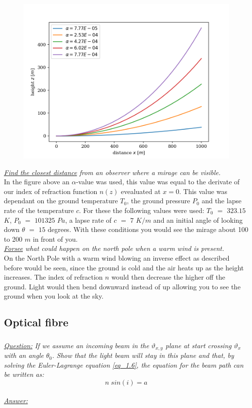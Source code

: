 \documentclass{article}
\begin{document}
\begin{figure}[h!]
	\centering
	\includegraphics[width=0.5\linewidth,keepaspectratio]{afbeeldingen/light path.png}
	\label{fig:paths}
\end{figure}

\textit{\underline{Find the closest distance} from an observer where a mirage can be visible.}\\
In the figure above an $\alpha$-value was used, this value was equal to the derivate of our index of refraction function $n(z)$ evealuated at $x=0$. This value was dependant on the ground temperature $T_0$, the ground pressure $P_0$ and the lapse rate of the temperature $c$. For these the following values were used: $T_0$ $=$ $323.15$ $K$, $P_0$ $=$ $101325$ $Pa$, a lapse rate of $c$ $=$ $7$ $K/m$ and an initial angle of looking down $\theta$ $=$ $15$ degrees. With these conditions you would see the mirage about 100 to 200 $m$ in front of you.\\

\textit{\underline{Forsee} what could happen on the north pole when a warm wind is present.}\\
On the North Pole with a warm wind blowing an inverse effect as described before would be seen, since the ground is cold and the air heats up as the height increases. The index of refraction $n$ would then decrease the higher off the ground. Light would then bend downward instead of up allowing you to see the ground when you look at the sky.

\subsection{Optical fibre}

\subsubsection{}

\textit{\underline{Question:} If we assume an incoming beam in the $\vartheta _{x,y}$ plane at start crossing $\vartheta _x$ with an angle $\theta _0$. Show that the light beam will stay in this plane and that, by solving the Euler-Lagrange equation \ref{eq_1.6}, the equation for the beam path can be written as:}\\
\begin{equation}
	n \; sin(i) = a
	\label{eq_2.1}
\end{equation}
\\
\textit{\underline{Answer:}} \\
\\
\end{document}
